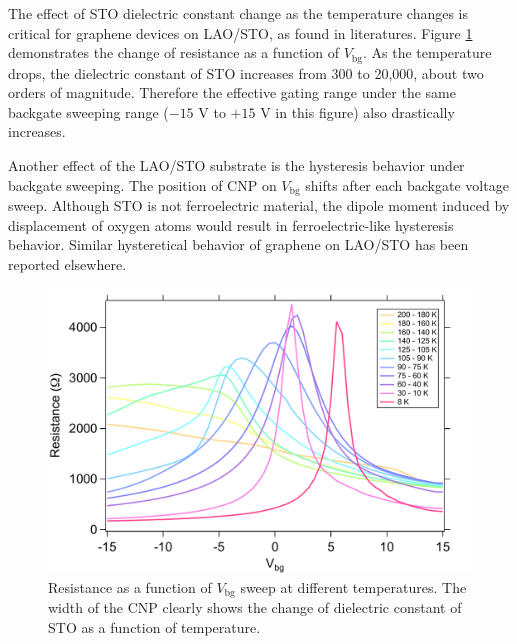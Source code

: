 \documentclass[pdflatex, sectionletters, 12pt, final, phd]{pittetd}    %
\begin{document}
The effect of STO dielectric constant change as the temperature changes is critical for graphene devices on LAO/STO, as found in literatures\cite{couto2011transport}. Figure \ref{FIG:ResistanceTemp} demonstrates the change of resistance as a function of $V_\mathrm{bg}$. As the temperature drops, the dielectric constant of STO increases from 300 to 20,000, about two orders of magnitude. Therefore the effective gating range under the same backgate sweeping range ($-15$ V to $+15$ V in this figure) also drastically increases. 

Another effect of the LAO/STO substrate is the hysteresis behavior under backgate sweeping. The position of CNP on $V_\mathrm{bg}$ shifts after each backgate voltage sweep. Although STO is not ferroelectric material, the dipole moment induced by displacement of oxygen atoms would result in ferroelectric-like hysteresis behavior\cite{sachs2014ferroelectric}. Similar hysteretical behavior of graphene on LAO/STO has been reported elsewhere\cite{jnawali2017room}. 

\begin{figure}[h!]
	\centering
	\vspace{0.85cm}
	\includegraphics[width=.8\textwidth]{Drawing/ResistanceTemp.pdf}
	\caption[Resistance as a function of $V_\mathrm{bg}$ sweep at different temperatures]{Resistance as a function of $V_\mathrm{bg}$ sweep at different temperatures. The width of the CNP clearly shows the change of dielectric constant of STO as a function of temperature.}
	\label{FIG:ResistanceTemp}
\end{figure}
\end{document}
